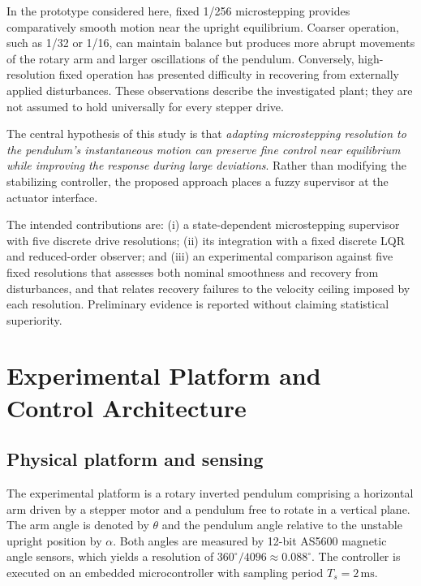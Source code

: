 \documentclass[conference]{IEEEtran}
\begin{document}
In the prototype considered here, fixed 1/256 microstepping provides comparatively smooth motion near the upright equilibrium. Coarser operation, such as 1/32 or 1/16, can maintain balance but produces more abrupt movements of the rotary arm and larger oscillations of the pendulum. Conversely, high-resolution fixed operation has presented difficulty in recovering from externally applied disturbances. These observations describe the investigated plant; they are not assumed to hold universally for every stepper drive.

The central hypothesis of this study is that \emph{adapting microstepping resolution to the pendulum's instantaneous motion can preserve fine control near equilibrium while improving the response during large deviations}. Rather than modifying the stabilizing controller, the proposed approach places a fuzzy supervisor at the actuator interface.

The intended contributions are: (i) a state-dependent microstepping supervisor with five discrete drive resolutions; (ii) its integration with a fixed discrete LQR and reduced-order observer; and (iii) an experimental comparison against five fixed resolutions that assesses both nominal smoothness and recovery from disturbances, and that relates recovery failures to the velocity ceiling imposed by each resolution. Preliminary evidence is reported without claiming statistical superiority.


\section{Experimental Platform and Control Architecture}
\subsection{Physical platform and sensing}
The experimental platform is a rotary inverted pendulum comprising a horizontal arm driven by a stepper motor and a pendulum free to rotate in a vertical plane. The arm angle is denoted by $\theta$ and the pendulum angle relative to the unstable upright position by $\alpha$. Both angles are measured by 12-bit AS5600 magnetic angle sensors, which yields a resolution of $360^\circ/4096\approx0.088^\circ$. The controller is executed on an embedded microcontroller with sampling period $T_s=2\,\mathrm{ms}$.
\end{document}
